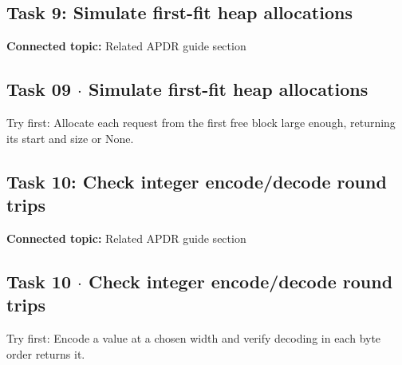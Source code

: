 \documentclass[11pt]{article}
\begin{document}
\begin{keepsection}
\section{Task 9: Simulate first-fit heap allocations}

\textbf{Connected topic:} Related APDR guide section

\begin{keepsection}
\subsection{Task 09 \ensuremath{\cdot} Simulate first-fit heap allocations}

Try first: Allocate each request from the first free block large enough, returning its start and size or None.

\end{keepsection}
\end{keepsection}

\begin{keepsection}
\section{Task 10: Check integer encode/decode round trips}

\textbf{Connected topic:} Related APDR guide section

\begin{keepsection}
\subsection{Task 10 \ensuremath{\cdot} Check integer encode/decode round trips}

Try first: Encode a value at a chosen width and verify decoding in each byte order returns it.

\end{keepsection}
\end{keepsection}


\clearpage
\end{document}
